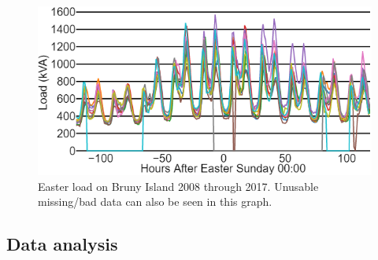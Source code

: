 \begin{figure}[htbp]
	\centerline{\includegraphics[width=.65\textwidth]{images/easter_bruny.png}}
	\caption{Easter load on Bruny Island 2008 through 2017.
		Unusable missing/bad data can also be seen in this graph.}
	\label{fig:bruny_easter}
\end{figure}

\subsection{Data analysis}
\label{bruny-data-analysis}



